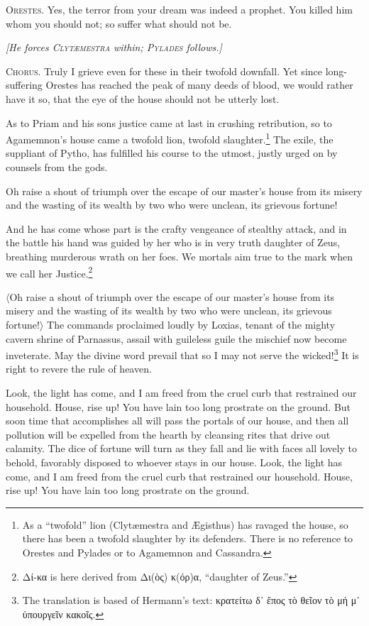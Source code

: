 \documentclass[12pt]{article}
\begin{document}
\textsc{Orestes.} Yes, the terror from your dream was indeed a prophet. You killed him whom you should not; so suffer what should not be.

\begin{center}
\textit{[He forces \textsc{Clyt{\ae}mestra} within; \textsc{Pylades} follows.]}
\end{center}

\textsc{Chorus.} Truly I grieve even for these in their twofold downfall. Yet since long-suffering Orestes has reached the peak of many deeds of blood, we would rather have it so, that the eye of the house should not be utterly lost.

As to Priam and his sons justice came at last in crushing retribution, so to Agamemnon's house came a twofold lion, twofold slaughter.\footnote{As a ``twofold'' lion (Clyt{\ae}mestra and {\AE}gisthus) has ravaged the house, so there has been a twofold slaughter by its defenders. There is no reference to Orestes and Pylades or to Agamemnon and Cassandra.} The exile, the suppliant of Pytho, has fulfilled his course to the utmost, justly urged on by counsels from the gods.

Oh raise a shout of triumph over the escape of our master's house from its misery and the wasting of its wealth by two who were unclean, its grievous fortune!

And he has come whose part is the crafty vengeance of stealthy attack, and in the battle his hand was guided by her who is in very truth daughter of Zeus, breathing murderous wrath on her foes. We mortals aim true to the mark when we call her Justice.\footnote{Δί-κα is here derived from Δι(ὸς) κ(όρ)α, ``daughter of Zeus.''}

$\langle$Oh raise a shout of triumph over the escape of our master's house from its misery and the wasting of its wealth by two who were unclean, its grievous fortune!$\rangle$ The commands proclaimed loudly by Loxias, tenant of the mighty cavern shrine of Parnassus, assail with guileless guile the mischief now become inveterate. May the divine word prevail that so I may not serve the wicked!\footnote{The translation is based of Hermann's text: κρατείτω δ᾽ ἔπος τὸ θεῖον τὸ μή μ᾽ ὑπουργεῖν κακοῖς.} It is right to revere the rule of heaven.

Look, the light has come, and I am freed from the cruel curb that restrained our household. House, rise up! You have lain too long prostrate on the ground. But soon time that accomplishes all will pass the portals of our house, and then all pollution will be expelled from the hearth by cleansing rites that drive out calamity. The dice of fortune will turn as they fall and lie with faces all lovely to behold, favorably disposed to whoever stays in our house. Look, the light has come, and I am freed from the cruel curb that restrained our household. House, rise up! You have lain too long prostrate on the ground.
\end{document}
